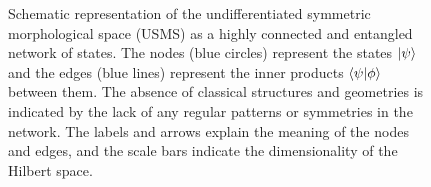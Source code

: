 \begin{figure}[h]
\centering
{}
\caption{Schematic representation of the undifferentiated symmetric morphological space (USMS) as a highly connected and entangled network of states. The nodes (blue circles) represent the states $\ket{\psi}$ and the edges (blue lines) represent the inner products $\braket{\psi|\phi}$ between them. The absence of classical structures and geometries is indicated by the lack of any regular patterns or symmetries in the network. The labels and arrows explain the meaning of the nodes and edges, and the scale bars indicate the dimensionality of the Hilbert space.}
\label{fig:usms}
\end{figure}